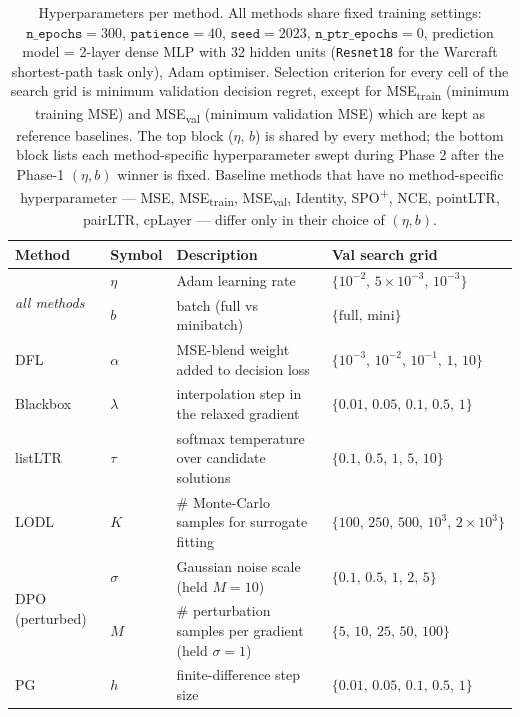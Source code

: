 \begin{table}[t]
\centering
\caption{Hyperparameters per method. All methods share fixed training settings: $\texttt{n\_epochs}{=}300$, $\texttt{patience}{=}40$, $\texttt{seed}{=}2023$, $\texttt{n\_ptr\_epochs}{=}0$, prediction model = 2-layer dense MLP with 32 hidden units (\texttt{Resnet18} for the Warcraft shortest-path task only), Adam optimiser. Selection criterion for every cell of the search grid is minimum validation decision regret, except for MSE\textsubscript{train} (minimum training MSE) and MSE\textsubscript{val} (minimum validation MSE) which are kept as reference baselines. The top block ($\eta$, $b$) is shared by every method; the bottom block lists each method-specific hyperparameter swept during Phase 2 after the Phase-1 $(\eta, b)$ winner is fixed. Baseline methods that have no method-specific hyperparameter --- MSE, MSE\textsubscript{train}, MSE\textsubscript{val}, Identity, SPO\textsuperscript{+}, NCE, pointLTR, pairLTR, cpLayer --- differ only in their choice of $(\eta, b)$.}
\label{tab:methods-hyperparams}
\setlength{\tabcolsep}{6pt}
\renewcommand{\arraystretch}{1.1}
\begin{tabular}{@{}l l p{2.6in} l@{}}
\toprule
Method & Symbol & Description & Val search grid \\
\midrule
\multirow{2}{*}{\textit{all methods}} & $\eta$ & Adam learning rate & $\{10^{-2},\,5{\!\times\!}10^{-3},\,10^{-3}\}$ \\
 & $b$ & batch (full vs minibatch) & $\{\mathrm{full},\,\mathrm{mini}\}$ \\
\midrule
DFL & $\alpha$ & MSE-blend weight added to decision loss & $\{10^{-3},\,10^{-2},\,10^{-1},\,1,\,10\}$ \\
\midrule
Blackbox & $\lambda$ & interpolation step in the relaxed gradient & $\{0.01,\,0.05,\,0.1,\,0.5,\,1\}$ \\
\midrule
listLTR & $\tau$ & softmax temperature over candidate solutions & $\{0.1,\,0.5,\,1,\,5,\,10\}$ \\
\midrule
LODL & $K$ & \# Monte-Carlo samples for surrogate fitting & $\{100,\,250,\,500,\,10^{3},\,2{\!\times\!}10^{3}\}$ \\
\midrule
\multirow{2}{*}{DPO (perturbed)} & $\sigma$ & Gaussian noise scale (held $M{=}10$) & $\{0.1,\,0.5,\,1,\,2,\,5\}$ \\
 & $M$ & \# perturbation samples per gradient (held $\sigma{=}1$) & $\{5,\,10,\,25,\,50,\,100\}$ \\
\midrule
PG & $h$ & finite-difference step size & $\{0.01,\,0.05,\,0.1,\,0.5,\,1\}$ \\
\bottomrule
\end{tabular}
\end{table}
